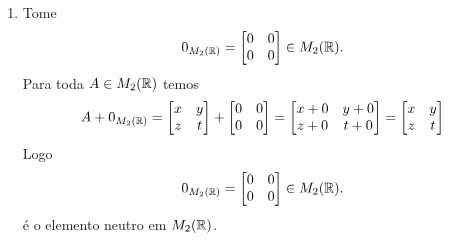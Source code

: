 \documentclass[12pt]{exam}
\begin{document}
\begin{enumerate}[label={\roman*})]
    \item Tome
    \[
        0_{M_2(\mathbb{R})} = \begin{bmatrix}
            0 & 0\\0 & 0
        \end{bmatrix} \in M_2(\mathbb{R}).
    \]
    Para toda $A \in M_2(\mathbb{R})$ temos
    \begin{align}
        A + 0_{M_2(\mathbb{R})} = \begin{bmatrix}
        x & y\\
        z & t
    \end{bmatrix} + \begin{bmatrix}
        0 & 0\\
        0 & 0
    \end{bmatrix} = \begin{bmatrix}
        x + 0& y + 0\\
        z + 0& t + 0
    \end{bmatrix} = \begin{bmatrix}
        x & y\\
        z & t
    \end{bmatrix}
    \end{align}
    Logo
    \[
        0_{M_2(\mathbb{R})} = \begin{bmatrix}
            0 & 0\\0 & 0
        \end{bmatrix} \in M_2(\mathbb{R}).
    \]
    \'e o elemento neutro em $M_2(\mathbb{R})$.


\end{enumerate}
\end{document}
